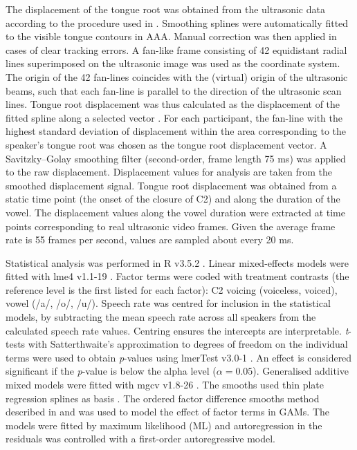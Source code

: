 \documentclass[12pt,]{article}
\begin{document}
The displacement of the tongue root was obtained from the ultrasonic
data according to the procedure used in \citet{kirkham2017}. Smoothing
splines were automatically fitted to the visible tongue contours in AAA.
Manual correction was then applied in cases of clear tracking errors. A
fan-like frame consisting of 42 equidistant radial lines superimposed on
the ultrasonic image was used as the coordinate system. The origin of
the 42 fan-lines coincides with the (virtual) origin of the ultrasonic
beams, such that each fan-line is parallel to the direction of the
ultrasonic scan lines. Tongue root displacement was thus calculated as
the displacement of the fitted spline along a selected vector
\citep{strycharczuk2015}. For each participant, the fan-line with the
highest standard deviation of displacement within the area corresponding
to the speaker's tongue root was chosen as the tongue root displacement
vector. A Savitzky--Golay smoothing filter (second-order, frame length
75 ms) was applied to the raw displacement. Displacement values for
analysis are taken from the smoothed displacement signal. Tongue root
displacement was obtained from a static time point (the onset of the
closure of C2) and along the duration of the vowel. The displacement
values along the vowel duration were extracted at time points
corresponding to real ultrasonic video frames. Given the average frame
rate is 55 frames per second, values are sampled about every 20 ms.

Statistical analysis was performed in R v3.5.2 \citep{r-core-team2018}.
Linear mixed-effects models were fitted with lme4 v1.1-19
\citep{bates2015}. Factor terms were coded with treatment contrasts (the
reference level is the first listed for each factor): C2 voicing
(voiceless, voiced), vowel (/a/, /o/, /u/). Speech rate was centred for
inclusion in the statistical models, by subtracting the mean speech rate
across all speakers from the calculated speech rate values. Centring
ensures the intercepts are interpretable. \emph{t}-tests with
Satterthwaite's approximation to degrees of freedom on the individual
terms were used to obtain \emph{p}-values using lmerTest v3.0-1
\citep{kuznetsova2017, luke2017}. An effect is considered significant if
the \emph{p}-value is below the alpha level (\(\alpha = 0.05\)).
Generalised additive mixed models were fitted with mgcv v1.8-26
\citep{wood2011, wood2017}. The smooths used thin plate regression
splines as basis \citep{wood2003}. The ordered factor difference smooths
method described in \citet{soskuthy2017} and \citet{wieling2018} was
used to model the effect of factor terms in GAMs. The models were fitted
by maximum likelihood (ML) and autoregression in the residuals was
controlled with a first-order autoregressive model.
\end{document}
